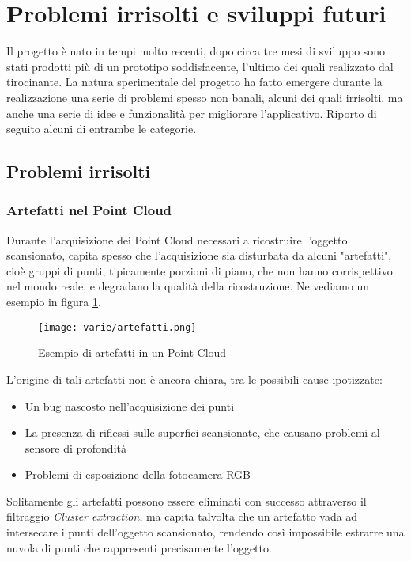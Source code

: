 \section{Problemi irrisolti e sviluppi futuri}
Il progetto è nato in tempi molto recenti, dopo circa tre mesi di sviluppo sono stati
prodotti più di un prototipo soddisfacente, l'ultimo dei quali realizzato dal tirocinante. La natura sperimentale del progetto ha fatto emergere durante la realizzazione una serie di problemi spesso non banali, alcuni dei quali irrisolti, ma anche una serie di idee e funzionalità per migliorare l'applicativo. Riporto di seguito alcuni di entrambe le categorie.
\subsection{Problemi irrisolti}
\subsubsection{Artefatti nel Point Cloud}
Durante l'acquisizione dei Point Cloud necessari a ricostruire l'oggetto scansionato, capita spesso che l'acquisizione sia disturbata da alcuni "artefatti", cioè gruppi di punti, tipicamente porzioni di piano, che non hanno corrispettivo nel mondo reale, e degradano la qualità della ricostruzione. Ne vediamo un esempio in figura \ref{fig:artefatti}.
\begin{figure}[!h] 
    \centering 
    \texttt{[image: varie/artefatti.png]} 
    \caption{Esempio di artefatti in un Point Cloud}
   \label{fig:artefatti}
\end{figure}
\newline
L'origine di tali artefatti non è ancora chiara, tra le possibili cause ipotizzate:
\begin{itemize}
\item Un bug nascosto nell'acquisizione dei punti
\item La presenza di riflessi sulle superfici scansionate, che causano problemi al sensore di profondità
\item Problemi di esposizione della fotocamera RGB
\end{itemize}
\noindent
Solitamente gli artefatti possono essere eliminati con successo attraverso il filtraggio \emph{Cluster extraction}, ma capita talvolta che un artefatto vada ad intersecare i punti dell'oggetto scansionato, rendendo così impossibile estrarre una nuvola di punti che rappresenti precisamente l'oggetto.

